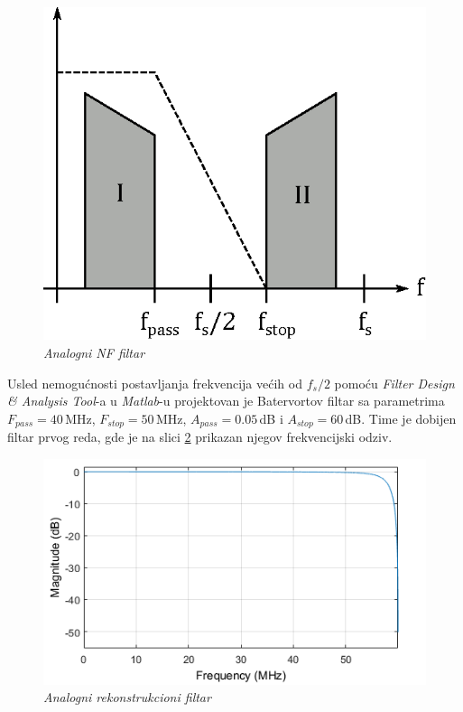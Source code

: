 \documentclass[conference]{IEEEtran}
\begin{document}
\begin{figure}[h]
	\centering
	\includegraphics[scale=0.7]{./slike/nikvistAnalog.eps}
	\caption{\textsl{Analogni NF filtar}}
	\label{slika:analogniNF}
\end{figure}
\pagebreak

Usled nemogućnosti postavljanja frekvencija većih od $f_s/2$ pomoću \textsl{Filter Design \& Analysis Tool}-a u \textsl{Matlab}-u projektovan je Batervortov filtar sa parametrima $F_{pass}=40$\,MHz, $F_{stop}=50$\,MHz, $A_{pass}=0.05$\,dB i $A_{stop}=60$\,dB. Time je dobijen filtar prvog reda, gde je na slici \ref{slika:analogni} prikazan njegov frekvencijski odziv.

\begin{figure}[h]
	\centering
	\includegraphics[scale=0.6]{./slike/analogni.png}
	\caption{\textsl{Analogni rekonstrukcioni filtar}}
	\label{slika:analogni}
\end{figure}
\end{document}
